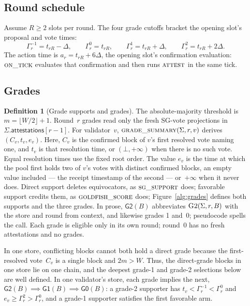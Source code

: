 \documentclass{article}
\theoremstyle{plain}
\theoremstyle{definition}
\newtheorem{definition}{Definition}
\theoremstyle{remark}
\newcommand{\attestations}{\mathsf{attestations}}
\newcommand{\fname}[1]{\text{\textsc{#1}}}
\newcommand{\Gtwo}{\mathsf{G2}}
\newcommand{\Gone}{\mathsf{G1}}
\newcommand{\Gzero}{\mathsf{G0}}
\begin{document}
\subsection{Round schedule}\label{sec:healing-schedule}

Assume $R\geq2$ slots per round.  The four grade cutoffs bracket the
opening slot's proposal and vote times:
\[
 \Gamma_r^{-1}=t_{rR}-\Delta,\qquad
 \Gamma_r^0=t_{rR},\qquad
 \Gamma_r^1=t_{rR}+\Delta,\qquad
 \Gamma_r^2=t_{rR}+2\Delta.
\]
The action time is $a_r=t_{rR}+6\Delta$, the opening slot's confirmation
evaluation: $\Call{on\_tick}{}$ evaluates that confirmation and then runs
$\Call{attest}{}$ in the same tick.

\subsection{Grades}\label{sec:grades}

\begin{definition}[Grade supports and grades]\label{def:grades}
The absolute-majority threshold is $m=\lfloor W/2\rfloor+1$.  Round~$r$
grades read only the fresh SG-vote projections in
$\Sigma.\attestations[r-1]$.  For validator~$v$,
$\Call{grade\_summary}{\Sigma,r,v}$ derives $(C_v,t_v,e_v)$.  Here, $C_v$
is the confirmed block of $v$'s first resolved vote naming one, and $t_v$
is that resolution time, or $(\bot,+\infty)$ when there is no such vote.
Equal resolution times use the fixed root order.  The value $e_v$ is the
time at which the pool first holds two of $v$'s votes with distinct
confirmed blocks, an empty value included --- the receipt timestamp of the
second --- or~$+\infty$ when it never does.
Direct support deletes equivocators, as $\fname{sg\_support}$ does;
favorable support credits them, as $\fname{goldfish\_score}$ does;
Figure~\ref{alg:grades} defines both supports and the three grades.
In prose, $\Gtwo(B)$ abbreviates
$\Call{G2}{\Sigma,r,B}$ with the store and round from context, and
likewise grades 1 and~0; pseudocode spells the call.
Each grade is eligible only in its own round; round~$0$ has no fresh
attestations and no grades.
\end{definition}

In one store, conflicting blocks cannot both hold a direct grade because
the first-resolved vote~$C_v$ is a single block and $2m>W$.
Thus, the direct-grade blocks in one store lie on one chain, and the
deepest grade-1 and grade-2 selections below are well defined.  In one
validator's store, each grade implies the next,
\mbox{$\Gtwo(B)\implies\Gone(B)\implies\Gzero(B)$}: a grade-2 supporter has
$t_v<\Gamma_r^{-1}<\Gamma_r^0$ and $e_v\geq\Gamma_r^2>\Gamma_r^0$, and a
grade-1 supporter satisfies the first favorable arm.
\end{document}
